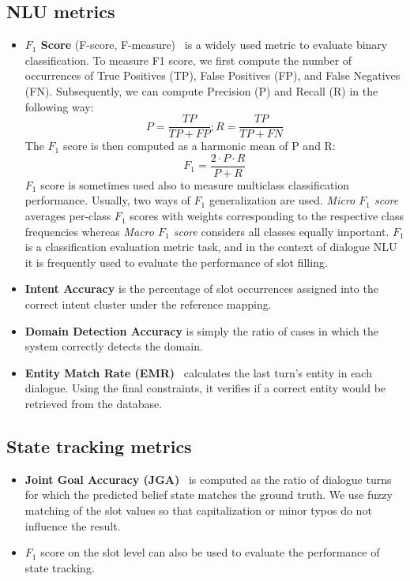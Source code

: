 \subsection{NLU metrics}
    \begin{itemize}
        \item \textbf{$F_1$ Score} (F-score, F-measure)~\cite{goutte2005probabilistic} is a widely used metric to evaluate binary classification.
    To measure F1 score, we first compute the number of occurrences of True Positives (TP), False Positives (FP), and False Negatives (FN).
    Subsequently, we can compute Precision (P) and Recall (R) in the following way:
    \begin{equation*}
        P = \frac{TP}{TP + FP}; R = \frac{TP}{TP + FN}
    \end{equation*}
    The $F_1$ score is then computed as a harmonic mean of P and R:
    \begin{equation*}
        F_1 = \frac{2\cdot P \cdot R}{P + R}
    \end{equation*}
    $F_1$ score is sometimes used also to measure multiclass classification performance.
    Usually, two ways of $F_1$ generalization are used. \emph{Micro $F_1$ score} averages per-class $F_1$ scores with weights corresponding to the respective class frequencies whereas \emph{Macro $F_1$ score} considers all classes equally important.
    $F_1$ is a classification evaluation metric task, and in the context of dialogue NLU it is frequently used to evaluate the performance of slot filling.
        \item \textbf{Intent Accuracy} is the percentage of slot occurrences assigned into the correct intent cluster under the reference mapping.
        \item \textbf{Domain Detection Accuracy} is simply the ratio of cases in which the system correctly detects the domain.
        \item \textbf{Entity Match Rate (EMR)}~\cite{wen2016network} calculates the last turn's entity in each dialogue. Using the final constraints, it verifies if a correct entity would be retrieved from the database.
    \end{itemize}
\subsection{State tracking metrics}
    \begin{itemize}
    \item \textbf{Joint Goal Accuracy (JGA)}~\cite{mrkvsic2016neural} is computed as the ratio of dialogue turns for which the predicted belief state matches the ground truth.
    We use fuzzy matching of the slot values so that capitalization or minor typos do not influence the result.
    \item $F_1$ score on the slot level can also be used to evaluate the performance of state tracking.
    \end{itemize}

